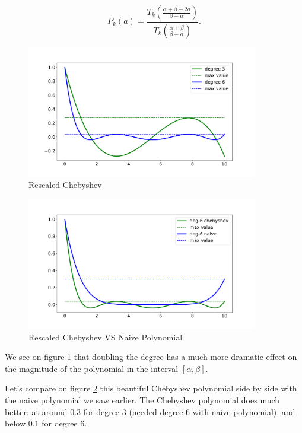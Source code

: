\begin{equation*}
P_k(a) = \frac{T_k\left(\frac{\alpha + \beta - 2a}{\beta - \alpha}\right)}{T_k\left(\frac{\alpha + \beta}{\beta - \alpha}\right)}.
\end{equation*}
\begin{figure}[ht]
\includegraphics[width=0.9\textwidth]{figures/lecture6-rescaled_cheb.pdf}
\centering
\caption{Rescaled Chebyshev}
\label{rescales_chebyshev}
\end{figure}

\begin{figure}[ht]
\includegraphics[width=0.9\textwidth]{figures/lecture6-rescaled_cheb_vs_naive.pdf}
\centering
\caption{Rescaled Chebyshev VS Naive Polynomial}
\label{rescaled_chebyshev_vs_naive_p}
\end{figure}

We see on figure \ref{rescales_chebyshev} that doubling the degree has a much more dramatic effect on the magnitude of the polynomial in the interval $[\alpha, \beta].$

Let's compare on figure \ref{rescaled_chebyshev_vs_naive_p} this beautiful Chebyshev polynomial side by side with the naive polynomial we saw earlier. The Chebyshev polynomial does much better: at around 0.3 for degree 3 (needed degree 6 with naive polynomial), and below 0.1 for degree 6.



